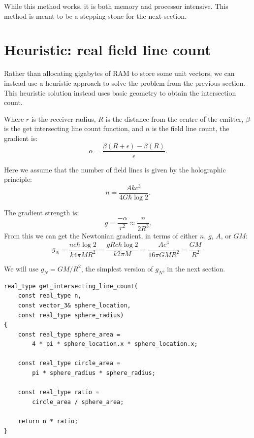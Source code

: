 \documentclass[12pt]{article}
\begin{document}
While this method works, it is both memory and processor intensive.
This method is meant to be a stepping stone for the next section.







\section{Heuristic: real field line count}

Rather than allocating gigabytes of RAM to store some unit vectors, we can instead use a heuristic approach to solve the problem from the previous section.
This heuristic solution instead uses basic geometry to obtain the intersection count.

Where $r$ is the receiver radius, $R$ is the distance from the centre of the emitter, $\beta$ is the get intersecting line count function, and $n$ is the field line count, the gradient is:
\begin{equation}
\alpha = \frac{\beta(R + \epsilon) - \beta(R)}{\epsilon}.
\end{equation}

Here we assume that the number of field lines is given by the holographic principle:
\begin{equation}
n = \frac{A k c^3}{ 4 G \hbar \log 2}.
\end{equation}

The gradient strength is:
\begin{equation}
g = \frac{-\alpha}{r^2} \approx \frac{n}{2 R^3}.
\end{equation}
From this we can get the Newtonian gradient, in terms of either $n$, $g$, $A$, or $G M$:
\begin{equation}
\label{g_N_equation}
g_N = \frac{n c \hbar \log 2}{k 4 \pi M R^2} = \frac{g R c \hbar \log 2}{k 2 \pi M} = \frac{A c^4}{16 \pi G M R^2} = \frac{G M}{R^2}.
\end{equation}

We will use $g_N = {G M}/{R^2}$, the simplest version of $g_N$, in the next section.

\begin{lstlisting}
real_type get_intersecting_line_count(
	const real_type n,
	const vector_3& sphere_location,
	const real_type sphere_radius)
{
	const real_type sphere_area = 
		4 * pi * sphere_location.x * sphere_location.x;

	const real_type circle_area = 
		pi * sphere_radius * sphere_radius;
	
	const real_type ratio = 
		circle_area / sphere_area;
	
	return n * ratio;
}
\end{lstlisting}
\end{document}
